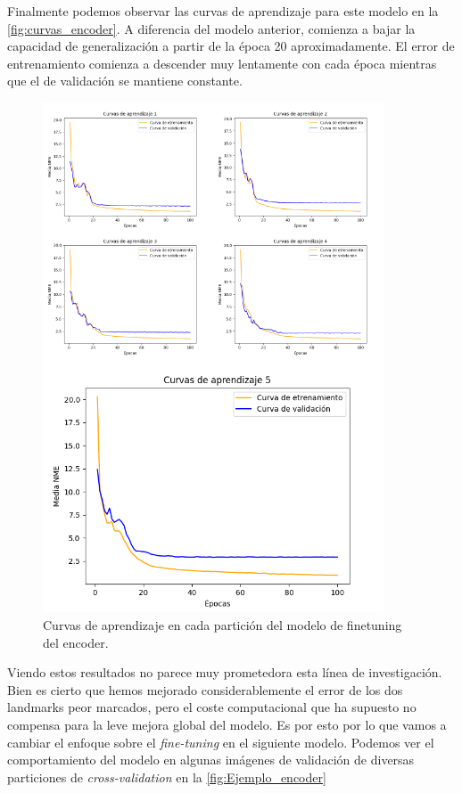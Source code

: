     \medskip

    \noindent Finalmente podemos observar las curvas de aprendizaje para este modelo en la \autoref{fig:curvas_encoder}. A diferencia del modelo anterior, comienza a bajar la capacidad de generalización a partir de la época 20 aproximadamente. El error de entrenamiento comienza a descender muy lentamente con cada época mientras que el de validación se mantiene constante.

    \begin{figure}[H]
        \centering
        \includegraphics[width=0.9\textwidth]{img/curvas_encoder.png}
        \caption{Curvas de aprendizaje en cada partición del modelo de finetuning del encoder.}
        \label{fig:curvas_encoder}
    \end{figure}

    \medskip

    \noindent Viendo estos resultados no parece muy prometedora esta línea de investigación. Bien es cierto que hemos mejorado considerablemente el error de los dos landmarks peor marcados, pero el coste computacional que ha supuesto no compensa para la leve mejora global del modelo. Es por esto por lo que vamos a cambiar el enfoque sobre el \textit{fine-tuning} en el siguiente modelo. Podemos ver el comportamiento del modelo en algunas imágenes de validación de diversas particiones de \textit{cross-validation} en la \autoref{fig:Ejemplo_encoder}

